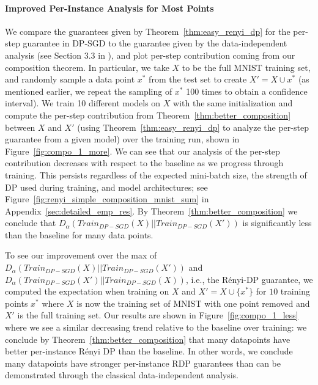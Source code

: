 \paragraph{Improved Per-Instance Analysis for Most Points} We compare the guarantees given by Theorem~\ref{thm:easy_renyi_dp} for the per-step guarantee in DP-SGD to the guarantee given by the data-independent analysis (see Section 3.3 in \citet{mironov2019r}), and plot per-step contribution coming from our composition theorem. In particular, we take $X$ to be the full MNIST training set, and randomly sample a data point $x^*$ from the test set to create $X' = X \cup x^*$ (as mentioned earlier, we repeat the sampling of $x^*$ 100 times to obtain a confidence interval). We train 10 different models on $X$ with the same initialization and compute the per-step contribution from Theorem~\ref{thm:better_composition} between $X$ and $X'$ (using Theorem~\ref{thm:easy_renyi_dp} to analyze the per-step guarantee from a given model) over the training run, shown in Figure~\ref{fig:compo_1_more}.
We can see that our analysis of the per-step contribution decreases with respect to the baseline as we progress through training. This persists regardless of the expected mini-batch size, the strength of DP used during training, and model architectures; see Figure~\ref{fig:renyi_simple_composition_mnist_sum} in Appendix~\ref{sec:detailed_emp_res}.
By Theorem~\ref{thm:better_composition} we conclude that $D_{\alpha}(Train_{DP-SGD}(X) || Train_{DP-SGD}(X'))$ is significantly less than the baseline for many data points. %



To see our improvement over the max of $D_{\alpha}(Train_{DP-SGD}(X) || Train_{DP-SGD}(X'))$ and \\ $D_{\alpha}(Train_{DP-SGD}(X') || Train_{DP-SGD}(X))$, i.e., the R\'enyi-DP guarantee, we computed the expectation when training on $X$ and $X'= X \cup \{x^*\}$  for $10$ training points $x^*$ where $X$ is now the training set of MNIST with one point removed and $X'$ is the full training set. Our results are shown in Figure~\ref{fig:compo_1_less} where we see a similar decreasing trend relative to the baseline over training: we conclude by Theorem~\ref{thm:better_composition} that many datapoints have better per-instance R\'enyi DP than the baseline. In other words, we conclude many datapoints have stronger per-instance RDP guarantees than can be demonstrated through the classical data-independent analysis.



